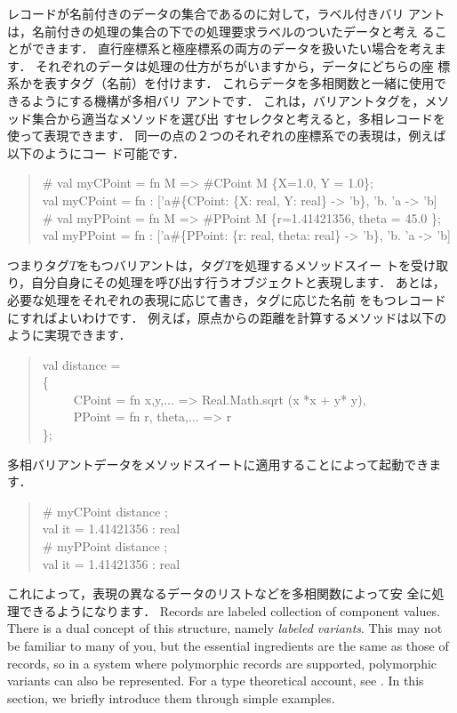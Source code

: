 \documentclass{jbook}
\newcommand{\myem}{\ \ \ \ \  }
\begin{document}
	レコードが名前付きのデータの集合であるのに対して，ラベル付きバリ
アントは，名前付きの処理の集合の下での処理要求ラベルのついたデータと考え
ることができます．
	直行座標系と極座標系の両方のデータを扱いたい場合を考えます．
	それぞれのデータは処理の仕方がちがいますから，データにどちらの座
標系かを表すタグ（名前）を付けます．
	これらデータを多相関数と一緒に使用できるようにする機構が多相バリ
アントです．
	これは，バリアントタグを，メソッド集合から適当なメソッドを選び出
すセレクタと考えると，多相レコードを使って表現できます．
	同一の点の２つのそれぞれの座標系での表現は，例えば以下のようにコー
ド可能です．		
\begin{tt}\begin{quote}
\# val myCPoint = fn M => \#CPoint M \{X=1.0, Y = 1.0\};\\
val myCPoint = fn : ['a\#\{CPoint: \{X: real, Y: real\} -> 'b\}, 'b. 'a -> 'b]\\
\# val myPPoint = fn M => \#PPoint M \{r=1.41421356, theta = 45.0 \};\\
val myPPoint = fn : ['a\#\{PPoint: \{r: real, theta: real\} -> 'b\}, 'b. 'a -> 'b]
\end{quote}\end{tt}
	つまりタグ$T$をもつバリアントは，タグ$T$を処理するメソッドスイー
トを受け取り，自分自身にその処理を呼び出す行うオブジェクトと表現します．
	あとは，必要な処理をそれぞれの表現に応じて書き，タグに応じた名前
をもつレコードにすればよいわけです．
	例えば，原点からの距離を計算するメソッドは以下のように実現できます．
\begin{tt}\begin{quote}
val distance = \\
\{\\
\myem CPoint = fn {x,y,...} => Real.Math.sqrt (x *x + y* y),\\
\myem PPoint = fn {r, theta,...} => r\\
\};
\end{quote}\end{tt}
	多相バリアントデータをメソッドスイートに適用することによって起動できます．
\begin{tt}\begin{quote}
\# myCPoint distance ;\\
val it = 1.41421356 : real\\
\# myPPoint distance ;\\
val it = 1.41421356 : real
\end{quote}\end{tt}
	これによって，表現の異なるデータのリストなどを多相関数によって安
全に処理できるようになります．
\else%
	Records are labeled collection of component values.
	There is a dual concept of this structure, namely {\em labeled
variants}.
	This may not be familiar to many of you, but the essential
ingredients are the same as those of records, so in a system where
polymorphic records are supported, polymorphic variants can also be
represented.
	For a type theoretical account, see \cite{ohor95toplas}.
	In this section, we briefly introduce them through simple
examples.
\end{document}

